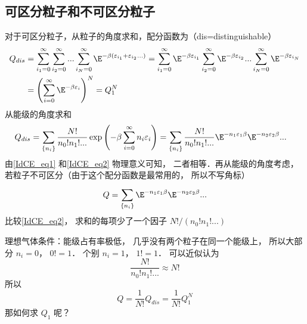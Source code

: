 
\subsection{可区分粒子和不可区分粒子}
对于可区分粒子，从粒子的角度求和，配分函数为（dis=distinguishable）
\begin{equation}\label{IdCE_eq1}
\begin{aligned}
{Q_{dis}} & = \sum\limits_{{i_1} = 0}^\infty  {\sum\limits_{{i_2} = 0}^\infty  {...\sum\limits_{{i_N} = 0}^\infty  {\E^{ - \beta ({\varepsilon_{i_1}} + {\varepsilon_{i_2}}...)}} } } = \sum\limits_{{i_1} = 0}^\infty  {\E^{ - \beta {\varepsilon_{i_1}}}} \sum\limits_{{i_2} = 0}^\infty  {\E^{ - \beta {\varepsilon_{i_2}}}} ...\sum\limits_{{i_N} = 0}^\infty  {\E^{ - \beta {\varepsilon_{i_N}}}} \\
& = {\left( {\sum\limits_{i = 0}^\infty  {\E^{ - \beta {\varepsilon_i}}} } \right)^N}= Q_1^N
\end{aligned}
\end{equation}
从能级的角度求和
\begin{equation}\label{IdCE_eq2}
\begin{aligned}
{Q_{dis}} & = \sum\limits_{\{ {n_i}\} }^{} {\frac{N!}{{n_0}!{n_1}!...}\exp \left( { - \beta \sum\limits_{i = 0}^\infty  {{n_i}{\varepsilon_i}} } \right)} = \sum\limits_{\{ {n_i}\} }^{} {\frac{N!}{{n_0}!{n_1}!...}{\E^{ - {n_1}{\varepsilon_1}\beta }}{\E^{ - {n_2}{\varepsilon_2}\beta }}...}
\end{aligned}
\end{equation}
由\autoref{IdCE_eq1} 和\autoref{IdCE_eq2} 物理意义可知， 二者相等．再从能级的角度考虑， 若粒子不可区分（由于这个配分函数是最常用的， 所以不写角标）
\begin{equation}\label{IdCE_eq3}
Q = \sum\limits_{\{ {n_i}\} }^{} {{\E^{ - {n_1}{\varepsilon_1}\beta }}{\E^{ - {n_2}{\varepsilon_2}\beta }}...}
\end{equation}
比较\autoref{IdCE_eq2}，  求和的每项少了一个因子 ${{N!}}/({{{n_0}!{n_1}!...}})$

理想气体条件：能级占有率极低， 几乎没有两个粒子在同一个能级上， 所以大部分 ${n_i} = 0$，  $0! = 1$．  个别 ${n_i} = 1$，  $1! = 1$．
可以近似认为
\begin{equation}
\frac{N!}{{n_0}!{n_1}!...} \approx N!
\end{equation}
所以
\begin{equation}
Q = \frac{1}{N!}{Q_{dis}} = \frac{1}{N!}Q_1^N
\end{equation}
那如何求 $Q_1$ 呢？ 

